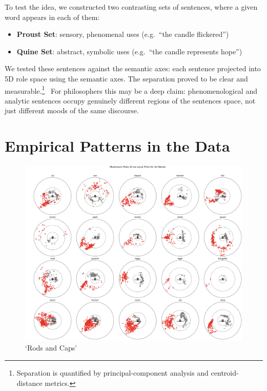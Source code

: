 \documentclass[12pt]{article}
\providecommand{\tightlist}{}   %
\providecommand{\pandocbounded}[1]{#1}   %
\begin{document}
To test the idea, we constructed two contrasting sets of sentences, where a given word appears in each of them:

\begin{itemize}
\tightlist
\item
  \textbf{Proust Set}: sensory, phenomenal uses (e.g.~``the candle flickered'')
\item
  \textbf{Quine Set}: abstract, symbolic uses (e.g.~``the candle represents hope'')
\end{itemize}

We tested these sentences against the semantic axes: each sentence projected into 5D role space using the semantic axes. The separation proved to be clear and measurable.\footnote{Separation is quantified by principal-component analysis and centroid-distance metrics.}~ For philosophers this may be a deep claim: phenomenological and analytic sentences occupy genuinely different regions of the sentences space, not just different moods of the same discourse.

\section{Empirical Patterns in the Data}\label{empirical-patterns-in-the-data}

\begin{figure}
\centering
\pandocbounded{\includegraphics[keepaspectratio]{figures/rods_and_caps.png}}
\caption{`Rods and Caps'}
\end{figure}
\end{document}
